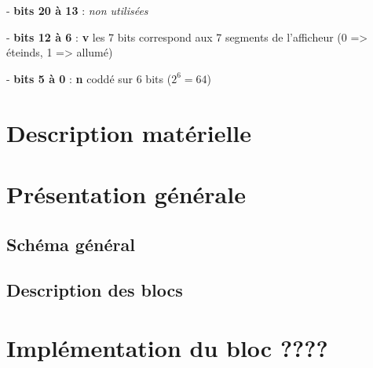 \documentclass[10pt]{article}
\begin{document}
        - \textbf{bits 20 à 13} : \textit{non utilisées} 

        - \textbf{bits 12 à 6} : \textbf{v} les 7 bits correspond aux 7 segments de l'afficheur (0 => éteinds, 1 => allumé)

        - \textbf{bits 5 à 0} : \textbf{n} coddé sur 6 bits ($2^6 = 64$)

    \newpage
    \section{Description matérielle}
    
    \newpage
    \section{Présentation générale}
        \subsection{Schéma général}
        \subsection{Description des blocs}
        
    \newpage
    \section{Implémentation du bloc ????}
    
    
\end{document}
